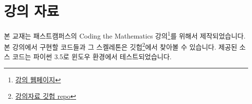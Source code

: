 \section*{강의 자료}

본 교재는 패스트캠퍼스의 Coding the Mathematics 강의\footnote{\href{http://www.fastcampus.co.kr/dev_camp_math/}{강의 웹페이지}}를 위해서 제작되었습니다. 본 강의에서 구현할 코드들과 그 스켈레톤은 깃헙\footnote{\href{https://github.com/principia12/dev_camp_math}{강의자료 깃헙 repo}}에서 찾아볼 수 있습니다. 제공된 소스 코드는 파이썬 3.5로 윈도우 환경에서 테스트되었습니다. 



